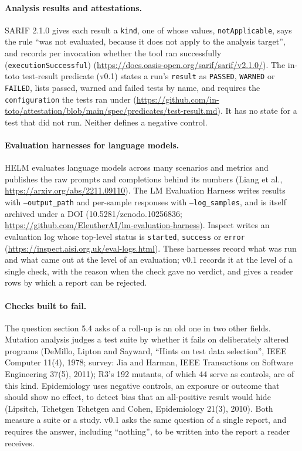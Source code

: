 \paragraph{Analysis results and attestations.} SARIF 2.1.0 gives each result a \texttt{kind}, one of whose values, \texttt{notApplicable}, says the rule ``was not evaluated, because it does not apply to the analysis target'', and records per invocation whether the tool ran successfully (\texttt{executionSuccessful}) (\url{https://docs.oasis-open.org/sarif/sarif/v2.1.0/}). The in-toto test-result predicate (v0.1) states a run's \texttt{result} as \texttt{PASSED}, \texttt{WARNED} or \texttt{FAILED}, lists passed, warned and failed tests by name, and requires the \texttt{configuration} the tests ran under (\url{https://github.com/in-toto/attestation/blob/main/spec/predicates/test-result.md}). It has no state for a test that did not run. Neither defines a negative control.

\paragraph{Evaluation harnesses for language models.} HELM evaluates language models across many scenarios and metrics and publishes the raw prompts and completions behind its numbers (Liang et al., \url{https://arxiv.org/abs/2211.09110}). The LM Evaluation Harness writes results with \texttt{--output\_path} and per-sample responses with \texttt{--log\_samples}, and is itself archived under a DOI (10.5281/zenodo.10256836; \url{https://github.com/EleutherAI/lm-evaluation-harness}). Inspect writes an evaluation log whose top-level status is \texttt{started}, \texttt{success} or \texttt{error} (\url{https://inspect.aisi.org.uk/eval-logs.html}). These harnesses record what was run and what came out at the level of an evaluation; v0.1 records it at the level of a single check, with the reason when the check gave no verdict, and gives a reader rows by which a report can be rejected.

\paragraph{Checks built to fail.} The question section 5.4 asks of a roll-up is an old one in two other fields. Mutation analysis judges a test suite by whether it fails on deliberately altered programs (DeMillo, Lipton and Sayward, ``Hints on test data selection'', IEEE Computer 11(4), 1978; survey: Jia and Harman, IEEE Transactions on Software Engineering 37(5), 2011); R3's 192 mutants, of which 44 serve as controls, are of this kind. Epidemiology uses negative controls, an exposure or outcome that should show no effect, to detect bias that an all-positive result would hide (Lipsitch, Tchetgen Tchetgen and Cohen, Epidemiology 21(3), 2010). Both measure a suite or a study. v0.1 asks the same question of a single report, and requires the answer, including ``nothing'', to be written into the report a reader receives.
